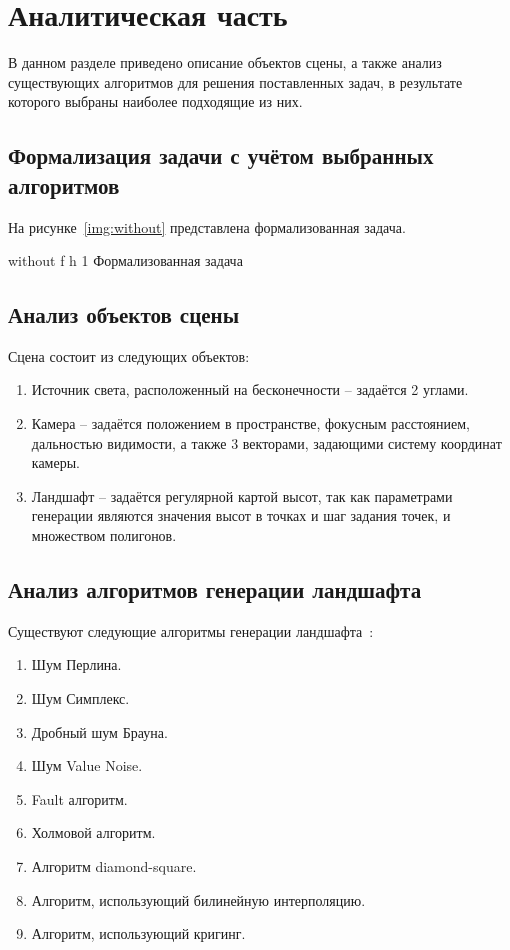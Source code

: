 \chapter{Аналитическая часть}

В данном разделе приведено описание объектов сцены, а также анализ существующих алгоритмов для решения поставленных задач, в результате которого выбраны наиболее подходящие из них.

\section{Формализация задачи с учётом выбранных алгоритмов}

На рисунке~\ref{img:without} представлена формализованная задача.

\FloatBarrier
{}
{without} %
{f} %
{h} %
{1\textwidth} %
{Формализованная задача} %
\FloatBarrier

\section{Анализ объектов сцены}

Сцена состоит из следующих объектов:

\begin{enumerate}[label=\arabic*.]
	\item Источник света, расположенный на бесконечности -- задаётся 2 углами.
	\item Камера -- задаётся положением в пространстве, фокусным расстоянием, дальностью видимости, а также 3 векторами, задающими систему координат камеры.
	\item Ландшафт -- задаётся регулярной картой высот, так как параметрами генерации являются значения высот в точках и шаг задания точек, и множеством полигонов.
\end{enumerate}

\section{Анализ алгоритмов генерации ландшафта}

Существуют следующие алгоритмы генерации ландшафта~\cite{landscapes}\cite{noises}\cite{nohabrinsource}\cite{usages}\cite{Voronezh}\cite{criging}:

\begin{enumerate}[label=\arabic*.]
	\item Шум Перлина.
	\item Шум Симплекс.
	\item Дробный шум Брауна.
	\item Шум Value Noise.
	\item Fault алгоритм.
	\item Холмовой алгоритм.
	\item Алгоритм diamond-square.
	\item Алгоритм, использующий билинейную интерполяцию.
	\item Алгоритм, использующий кригинг.
\end{enumerate}

